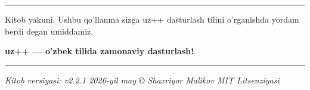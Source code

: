 \documentclass[a4paper,11pt,twoside,openright]{book}
\begin{document}
\begin{center}\rule{0.5\linewidth}{0.5pt}\end{center}

Kitob yakuni. Ushbu qo'llanma sizga uz++ dasturlash tilini o'rganishda yordam
berdi degan umiddamiz.

\textbf{uz++ --- o'zbek tilida zamonaviy dasturlash!}

\begin{center}\rule{0.5\linewidth}{0.5pt}\end{center}

\emph{Kitob versiyasi: v2.2.1 \textbar{} 2026-yil may \textbar{} © Shaxriyor
Malikov \textbar{} MIT Litsenziyasi}

\newpage
\end{document}
